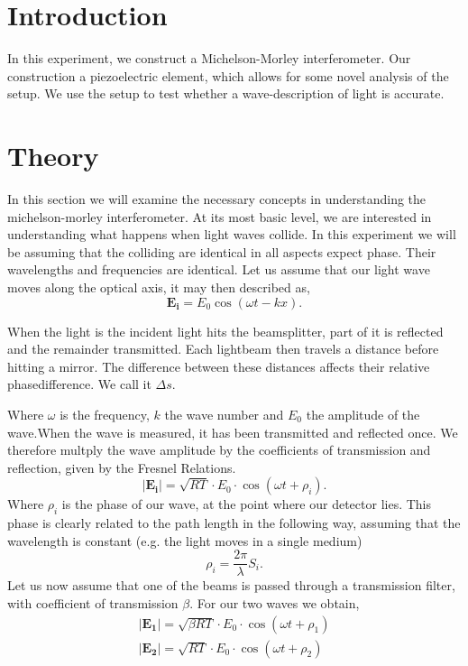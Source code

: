 \documentclass[working, oneside]{inputs/tuftebook}
\begin{document}

\section*{Introduction}
In this experiment, we construct a Michelson-Morley interferometer. Our construction a piezoelectric element, which allows for some novel analysis of the setup. We use the setup to test whether a wave-description of light is accurate.
\section*{Theory}
In this section we will examine the necessary concepts in understanding the michelson-morley interferometer. At its most basic level, we are interested in understanding what happens when light waves collide. In this experiment we will be assuming that the colliding are identical in all aspects expect phase. Their wavelengths and frequencies are identical. Let us assume that our light wave moves along the optical axis, it may then described as,
\[
	\bm{E_i} = E_0 \cos\left( \omega t - kx \right) 
.\] 
\begin{marginfigure}
    \centering
    \caption{When the light is the incident light hits the beamsplitter, part of it is reflected and the remainder transmitted. Each lightbeam then travels a distance before hitting a mirror. The difference between these distances affects their relative phasedifference. We call it $\Delta s$.}
    \label{fig:fig1}
\end{marginfigure}
Where $\omega$ is the frequency, $k$ the wave number and $E_0$ the amplitude of the wave.When the wave is measured, it has been transmitted and reflected once. We therefore multply the wave amplitude by the coefficients of transmission and reflection, given by the Fresnel Relations.\cite{Grif}
 \[
	 \left|\bm{E_i}\right| = \sqrt{RT} \cdot E_0 \cdot \cos\left( \omega t + \rho _i \right) 
.\] 
Where $\rho_i$ is the phase of our wave, at the point where our detector lies. This phase is clearly related to the path length in the following way, assuming that the wavelength is constant (e.g. the light moves in a single medium)
\[
\rho _i  =  \frac{2\pi}{\lambda} S_i
.\]
Let us now assume that one of the beams is passed through a transmission filter, with coefficient of transmission $\beta$. For our two waves we obtain,
\begin{align*}
	\left|\bm{E_1}\right| = \sqrt{\beta RT} \cdot E_0 \cdot \cos\left( \omega t + \rho _1 \right) \\
	\left|\bm{E_2}\right| = \sqrt{RT} \cdot E_0 \cdot \cos\left( \omega t + \rho _2 \right) 
\end{align*}
\end{document}
